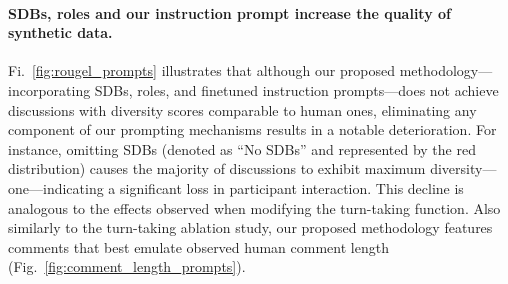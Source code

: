 \paragraph{\acp{SDB}, roles and our instruction prompt increase the quality of synthetic data.} Fi.~\ref{fig:rougel_prompts} illustrates that although our proposed methodology—incorporating \acp{SDB}, roles, and finetuned instruction prompts—does not achieve discussions with diversity scores comparable to human ones, eliminating any component of our prompting mechanisms results in a notable deterioration. For instance, omitting \acp{SDB} (denoted as ``No \acp{SDB}'' and represented by the red distribution) causes the majority of discussions to exhibit maximum diversity—one—indicating a significant loss in participant interaction. This decline is analogous to the effects observed when modifying the turn-taking function. Also similarly to the turn-taking ablation study, our proposed methodology features comments that best emulate observed human comment length (Fig.~\ref{fig:comment_length_prompts}).